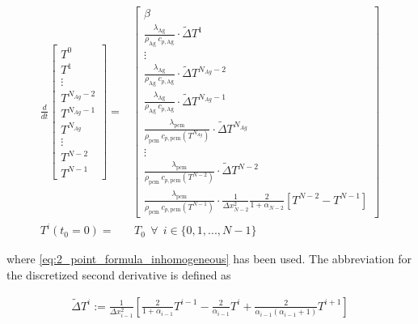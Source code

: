 \documentclass{scrartcl}[12pt, halfparskip]
\numberwithin{equation}{section}
\numberwithin{figure}{section}
\numberwithin{table}{section}
\begin{document}
\begin{align}
\frac{d}{dt} \begin{bmatrix*}
T^0 \\[1ex]
T^1 \\[0.3ex]
\vdots \\[1ex]
T^{N_{Ag}-2} \\[1.7ex]
T^{N_{Ag}-1} \\[1.7ex]
T^{N_{Ag}} \\[0.5ex]
\vdots \\[1.5ex]
T^{N-2} \\[1ex]
T^{N-1}
\end{bmatrix*} = &
\begin{bmatrix}
\beta \\
\frac{\lambda_{\text{Ag}}}{\rho_{\text{Ag}} \ c_{p,\text{Ag}}} \cdot \tilde{\Delta} T^1 \\[0.7ex]
\vdots \\[0.3ex]
\frac{\lambda_{\text{Ag}}}{\rho_{\text{Ag}} \ c_{p,\text{Ag}}} \cdot \tilde{\Delta} T^{N_{Ag}-2} \\[1.5ex]
\frac{\lambda_{\text{Ag}}}{\rho_{\text{Ag}} \ c_{p,\text{Ag}}} \cdot \tilde{\Delta} T^{N_{Ag}-1} \\[1.5ex]
\frac{\lambda_{\text{pcm}}}{\rho_{\text{pcm}} \ c_{p,{\text{pcm}}}(T^{N_{Ag}})} \cdot \tilde{\Delta} T^{N_{Ag}} \\[0.5ex]
\vdots \\[0.5ex]
\frac{\lambda_{\text{pcm}}}{\rho_{\text{pcm}} \ c_{p,{\text{pcm}}}(T^{N-2})} \cdot \tilde{\Delta} T^{N-2} \\[0.5ex]
\frac{\lambda_{\text{pcm}}}{\rho_{\text{pcm}} \ c_{p,\text{pcm}}(T^{N-1})} \cdot \frac{1}{\Delta x_{N-2}^2} \frac{2}{1 + \alpha_{N-2}} [T^{N-2} - T^{N-1}]
\end{bmatrix} \label{eq:heat_equation_discretized} \\[2ex]
T^i(t_0=0) = & \ T_0 \ \ \forall \ \ i \in \{ 0,1,...,N-1 \} \nonumber
\end{align}

where \cref{eq:2_point_formula_inhomogeneous} has been used. The abbreviation for the discretized second derivative is defined as

\begin{align}
	\tilde{\Delta} T^i := \frac{1}{\Delta x_{i-1}^2} \left[ \frac{2}{1+\alpha_{i-1}} T^{i-1} - \frac{2}{\alpha_{i-1}} T^{i} + \frac{2}{\alpha_{i-1} (\alpha_{i-1} + 1)} T^{i+1} \right]
\end{align}
\end{document}
